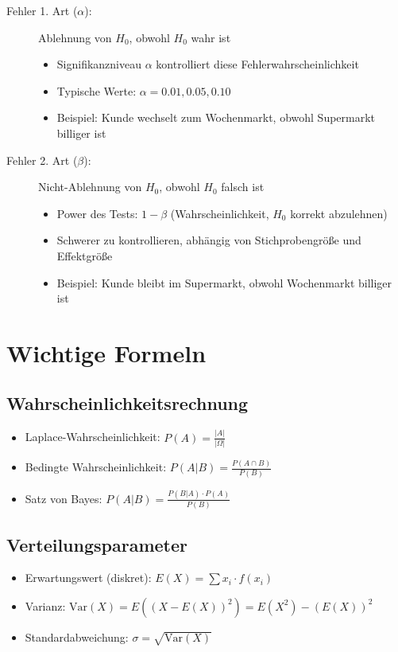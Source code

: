 \documentclass[12pt, a4paper, titlepage, ngerman]{scrartcl}
\begin{document}
\begin{description}
  \item[Fehler 1. Art ($\alpha$):] Ablehnung von $H_0$, obwohl $H_0$ wahr ist
    \begin{itemize}
      \item Signifikanzniveau $\alpha$ kontrolliert diese Fehlerwahrscheinlichkeit
      \item Typische Werte: $\alpha = 0.01, 0.05, 0.10$
      \item Beispiel: Kunde wechselt zum Wochenmarkt, obwohl Supermarkt billiger ist
    \end{itemize}
  \item[Fehler 2. Art ($\beta$):] Nicht-Ablehnung von $H_0$, obwohl $H_0$ falsch ist
    \begin{itemize}
      \item Power des Tests: $1 - \beta$ (Wahrscheinlichkeit, $H_0$ korrekt abzulehnen)
      \item Schwerer zu kontrollieren, abhängig von Stichprobengröße und Effektgröße
      \item Beispiel: Kunde bleibt im Supermarkt, obwohl Wochenmarkt billiger ist
    \end{itemize}
\end{description}

\section{Wichtige Formeln}

\subsection{Wahrscheinlichkeitsrechnung}

\begin{itemize}
  \item Laplace-Wahrscheinlichkeit: $P(A) = \frac{|A|}{|\Omega|}$
  \item Bedingte Wahrscheinlichkeit: $P(A|B) = \frac{P(A \cap B)}{P(B)}$
  \item Satz von Bayes: $P(A|B) = \frac{P(B|A) \cdot P(A)}{P(B)}$
\end{itemize}

\subsection{Verteilungsparameter}

\begin{itemize}
  \item Erwartungswert (diskret): $E(X) = \sum x_i \cdot f(x_i)$
  \item Varianz: $\text{Var}(X) = E((X - E(X))^2) = E(X^2) - (E(X))^2$
  \item Standardabweichung: $\sigma = \sqrt{\text{Var}(X)}$
\end{itemize}
\end{document}
